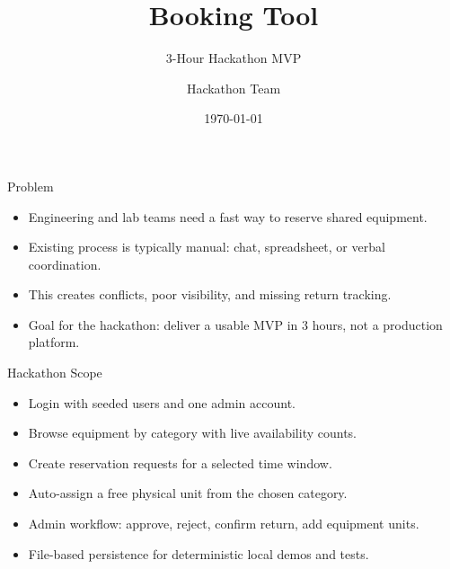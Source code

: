 \documentclass[aspectratio=169]{beamer}
\title{Booking Tool}
\subtitle{3-Hour Hackathon MVP}
\author{Hackathon Team}
\institute{Internal Equipment Reservation Tool}
\date{\today}
\begin{document}
\begin{frame}
  \titlepage
\end{frame}

\begin{frame}{Problem}
  \begin{itemize}
    \item Engineering and lab teams need a fast way to reserve shared equipment.
    \item Existing process is typically manual: chat, spreadsheet, or verbal coordination.
    \item This creates conflicts, poor visibility, and missing return tracking.
    \item Goal for the hackathon: deliver a usable MVP in 3 hours, not a production platform.
  \end{itemize}
\end{frame}

\begin{frame}{Hackathon Scope}
  \begin{itemize}
    \item Login with seeded users and one admin account.
    \item Browse equipment by category with live availability counts.
    \item Create reservation requests for a selected time window.
    \item Auto-assign a free physical unit from the chosen category.
    \item Admin workflow: approve, reject, confirm return, add equipment units.
    \item File-based persistence for deterministic local demos and tests.
  \end{itemize}
\end{frame}
\end{document}
